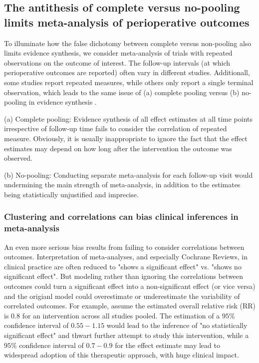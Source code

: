 \documentclass[11pt,notitlepage]{article}
\begin{document}
\subsection*{The antithesis of complete versus no-pooling limits meta-analysis of perioperative outcomes}
To illuminate how the false dichotomy between complete versus non-pooling also limits evidence 
synthesis, we consider meta-analysis of trials with repeated observations on the outcome of interest. 
The follow-up intervals (at which perioperative outcomes are reported) 
often vary in different studies. Additionall, some studies report repeated measures, while
others only report a single terminal observation, which leads to the same issue of (a) complete pooling 
versus (b) no-pooling in evidence synthesis 
\cite{Roth2015CriticalCare}.

(a) Complete pooling:
Evidence synthesis of all effect estimates at all time points irrespective of follow-up time 
fails to consider the correlation of repeated measure. Obviously, it is usually inappropriate 
to ignore the fact that the effect estimates may depend on how long after the intervention the outcome was observed.

(b) No-pooling: Conducting separate meta-analysis for each follow-up visit would undermining the main 
strength of meta-analysis, in addition to the estimates being statistically unjustified and imprecise.

\subsubsection*{Clustering and correlations can bias clinical inferences in meta-analysis }
An even more serious bias results from failing to consider correlations 
between outcomes. Interpretation of meta-analyses, and especially Cochrane Reviews, in clinical practice 
are often reduced to "shows a significant effect" vs. "shows no significant effect". But modeling rather than
ignoring the correlations between outcomes could turn a significant effect into a non-significant effect 
(or vice versa) and the origianl model could overestimate or underestimate the variability of correlated outcomes. 
For example, assume the estimated overall relative risk (RR) is $0.8$ for an 
intervention across all studies pooled. The estimation of a $95$\% confidence 
interval of $0.55-1.15$ would lead to the inference of "no statistically 
significant effect" and thwart further attempt to study this intervention, 
while a $95$\% confidence interval of $0.7-0.9$ for the effect estimate may 
lead to widespread adoption of this therapeutic approach, with huge clinical impact.
\end{document}
